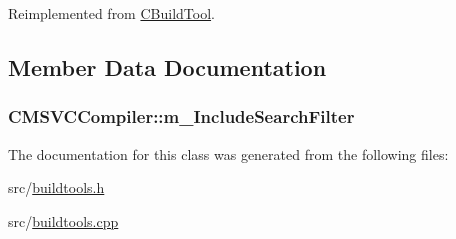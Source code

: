 Reimplemented from \hyperlink{classCBuildTool_ad07fcd46ccc841bc131d65505e5343c1}{C\-Build\-Tool}.



\subsection{Member Data Documentation}
\hypertarget{classCMSVCCompiler_ad92703ebd37a1b940847f18f3d393360}{
\subsubsection[{m\-\_\-\-Include\-Search\-Filter}]{ C\-M\-S\-V\-C\-Compiler\-::m\-\_\-\-Include\-Search\-Filter\hspace{0.3cm}{\ttfamily [private]}}}\label{classCMSVCCompiler_ad92703ebd37a1b940847f18f3d393360}


The documentation for this class was generated from the following files\-:\begin{DoxyCompactItemize}
\item 
src/\hyperlink{buildtools_8h}{buildtools.\-h}\item 
src/\hyperlink{buildtools_8cpp}{buildtools.\-cpp}\end{DoxyCompactItemize}
